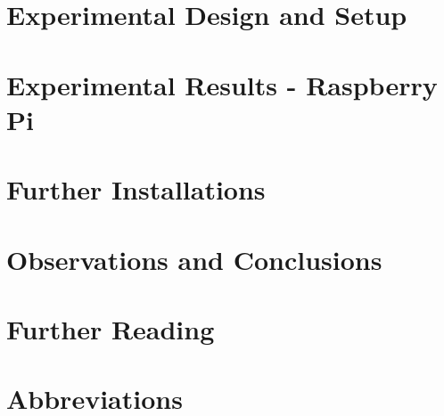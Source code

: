 \documentclass[english]{report}
\begin{document}
\chapter{Experimental Design and Setup}



\chapter{Experimental Results - Raspberry Pi}



\chapter{Further Installations}



\chapter{Observations and Conclusions}



\chapter{Further Reading}



\appendix

%


\chapter{Abbreviations}

\printacronyms[include-classes=abbrev,name=]

\newpage


%




\end{document}
